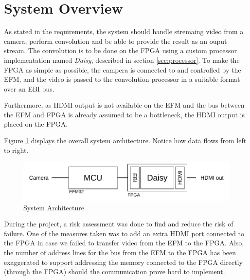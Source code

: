 \section{System Overview}
As stated in the requirements, the system should handle stremaing video from a camera, perform convolution and be able to provide the result as an ouput stream.
The convolution is to be done on the FPGA using a custom processor implementation named \emph{Daisy}, described in section \ref{sec:processor}.
To make the FPGA as simple as possible, the campera is connected to and controlled by the EFM, and the video is passed to the convolution processor in a suitable format over an EBI bus.

Furthermore, as HDMI output is not available on the EFM and the bus between the EFM and FPGA is already assumed to be a bottleneck, the HDMI output is placed on the FPGA.

Figure \ref{fig:systemArchitecture} displays the overall system architecture. Notice how data flows from left to right.

\begin{figure}[h!]
    \includegraphics{img/systemArchitecture.pdf}
    \caption{System Architecture}
    \label{fig:systemArchitecture}
\end{figure}

During the project, a risk assessment was done to find and reduce the risk of failure.
One of the measures taken was to add an extra HDMI port connected to the FPGA in case we failed to transfer video from the EFM to the FPGA.
Also, the number of address lines for the bus from the EFM to the FPGA has been exaggerated to support addressing the memory connected to the FPGA directly (through the FPGA) should the communication prove hard to implement.
